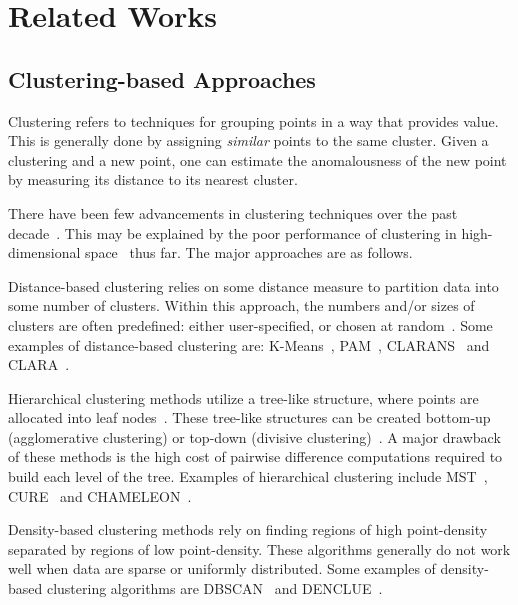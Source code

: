 \section{Related Works}
\label{sec:related-works}

\subsection{Clustering-based Approaches}
\label{subsec:related-works:clustering-based-approaches}

Clustering refers to techniques for grouping points in a way that provides value.
This is generally done by assigning \textit{similar} points to the same cluster.
Given a clustering and a new point, one can estimate the anomalousness of the new point by measuring its distance to its nearest cluster.

There have been few advancements in clustering techniques over the past decade~\cite{wang2019progress}.
This may be explained by the poor performance of clustering in high-dimensional space~\cite{zhang2013advancements} thus far.
The major approaches are as follows.

Distance-based clustering relies on some distance measure to partition data into some number of clusters.
Within this approach, the numbers and/or sizes of clusters are often predefined: either user-specified, or chosen at random~\cite{wang2019progress}.
Some examples of distance-based clustering are:
K-Means~\cite{macqueen1967some},
PAM~\cite{kaufman2009finding},
CLARANS~\cite{ng1994efficient} and
CLARA~\cite{kaufman2009finding}.

Hierarchical clustering methods utilize a tree-like structure, where points are allocated into leaf nodes~\cite{wang2019progress}.
These tree-like structures can be created bottom-up (agglomerative clustering) or top-down (divisive clustering)~\cite{agrawal1998automatic}.
A major drawback of these methods is the high cost of pairwise difference computations required to build each level of the tree.
Examples of hierarchical clustering include
MST~\cite{charles_zahn_graph_1971},
CURE~\cite{guha1998cure} and
CHAMELEON~\cite{karypis1999hierarchical}.

Density-based clustering methods rely on finding regions of high point-density separated by regions of low point-density.
These algorithms generally do not work well when data are sparse or uniformly distributed.
Some examples of density-based clustering algorithms are
DBSCAN~\cite{ester1996density} and
DENCLUE~\cite{hinneburg1998efficient}.

